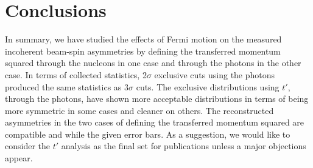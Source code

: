 \documentclass[a4paper,11pt,twoside]{article}
\begin{document}
\section*{Conclusions}
In summary, we have studied the effects of Fermi motion on the measured 
incoherent beam-spin asymmetries by defining the transferred momentum squared 
through the nucleons in one case and through the photons in the other case. In 
terms of collected statistics, 2$\sigma$ exclusive cuts using the photons 
produced the same statistics as 3$\sigma$ cuts. The exclusive distributions 
using $t'$, through the photons, have shown more acceptable distributions in 
terms of being more symmetric in some cases and cleaner on others. The 
reconstructed asymmetries in the two cases of defining the transferred momentum 
squared are compatible and while the given error bars. As a suggestion, we 
would like to consider the $t'$ analysis as the final set for publications 
unless a major objections appear.
\end{document}
